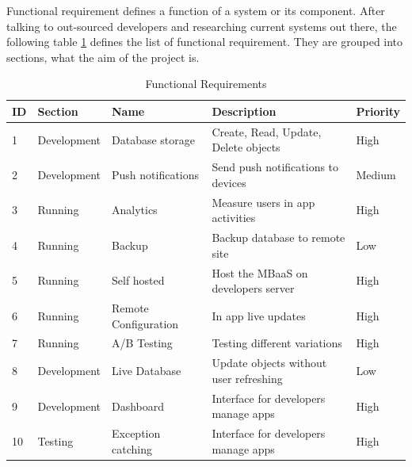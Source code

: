 Functional requirement defines a function of a system or its component. After talking to out-sourced developers and researching current systems out there, the following table \ref{tb:functional} defines the list of functional requirement. They are grouped into sections, what the aim of the project is. 

\begin{table}[h]
\centering
\caption{Functional Requirements}
\label{tb:functional}
\begin{tabular}{|l|l|l|l|l|}
\hline
\cellcolor{green!20}ID & \cellcolor{green!20}Section  & \cellcolor{green!20}Name  & \cellcolor{green!20}Description        & \cellcolor{green!20}Priority \\ \hline
1                      & Development                  & Database storage          & Create, Read, Update, Delete objects   & High   \\ \hline
2                      & Development                  & Push notifications        & Send push notifications to devices     & Medium \\ \hline
3                      & Running                      & Analytics                 & Measure users in app activities        & High   \\ \hline
4                      & Running                      & Backup                    & Backup database to remote site         & Low    \\ \hline
5                      & Running                      & Self hosted               & Host the MBaaS on developers server    & High   \\ \hline
6                      & Running                      & Remote Configuration      & In app live updates                    & High   \\ \hline
7                      & Running                      & A/B Testing               & Testing different variations           & High   \\ \hline
8                      & Development                  & Live Database             & Update objects without user refreshing & Low    \\ \hline
9                      & Development                  & Dashboard                & Interface for developers manage apps   & High   \\ \hline
10                     & Testing                      & Exception catching      & Interface for developers manage apps   & High   \\ \hline
\end{tabular}
\end{table}

